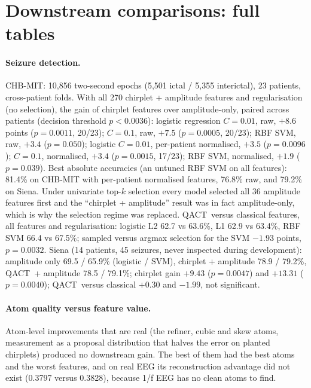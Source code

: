 \documentclass{article}
\newcommand{\qact}{QACT}
\begin{document}
\section{Downstream comparisons: full tables}
\label{app:downstream}
\paragraph{Seizure detection.} CHB-MIT: 10,856 two-second epochs (5,501 ictal / 5,355 interictal), 23 patients, cross-patient folds. With all 270 chirplet + amplitude features and regularisation (no selection), the gain of chirplet features over amplitude-only, paired across patients (decision threshold $p<0.0036$): logistic regression $C=0.01$, raw, $+8.6$ points ($p=0.0011$, 20/23); $C=0.1$, raw, $+7.5$ ($p=0.0005$, 20/23); RBF SVM, raw, $+3.4$ ($p=0.050$); logistic $C=0.01$, per-patient normalised, $+3.5$ ($p=0.0096$); $C=0.1$, normalised, $+3.4$ ($p=0.0015$, 17/23); RBF SVM, normalised, $+1.9$ ($p=0.039$). Best absolute accuracies (an untuned RBF SVM on all features): 81.4\% on CHB-MIT with per-patient normalised features, 76.8\% raw, and 79.2\% on Siena. Under univariate top-$k$ selection every model selected all 36 amplitude features first and the ``chirplet + amplitude'' result was in fact amplitude-only, which is why the selection regime was replaced. \qact\ versus classical features, all features and regularisation: logistic L2 62.7 vs 63.6\%, L1 62.9 vs 63.4\%, RBF SVM 66.4 vs 67.5\%; sampled versus argmax selection for the SVM $-1.93$ points, $p=0.0032$. Siena (14 patients, 45 seizures, never inspected during development): amplitude only 69.5 / 65.9\% (logistic / SVM), chirplet + amplitude 78.9 / 79.2\%, \qact\ + amplitude 78.5 / 79.1\%; chirplet gain $+9.43$ ($p=0.0047$) and $+13.31$ ($p=0.0040$); \qact\ versus classical $+0.30$ and $-1.99$, not significant.

\paragraph{Atom quality versus feature value.} Atom-level improvements that are real (the refiner, cubic and skew atoms, measurement as a proposal distribution that halves the error on planted chirplets) produced no downstream gain. The best of them had the best atoms and the worst features, and on real EEG its reconstruction advantage did not exist (0.3797 versus 0.3828), because 1/f EEG has no clean atoms to find.
\end{document}

